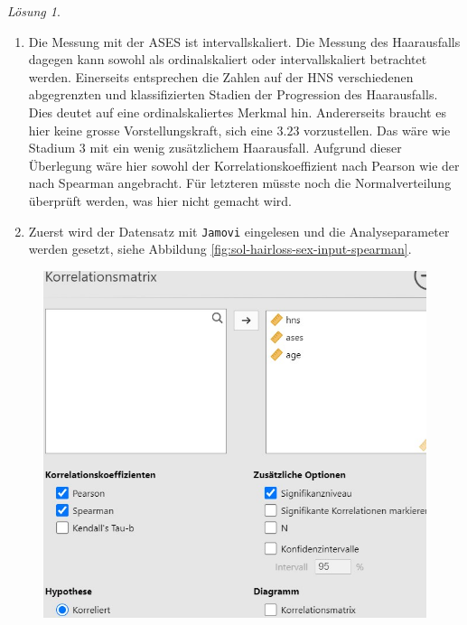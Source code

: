 \documentclass[
]{book}
\providecommand{\tightlist}{%
  \setlength{\itemsep}{0pt}\setlength{\parskip}{0pt}}
\theoremstyle{definition}
\theoremstyle{definition}
\theoremstyle{definition}
\theoremstyle{definition}
\theoremstyle{remark}
\newtheorem*{solution}{Lösung}
\begin{document}
\begin{solution}
\leavevmode

\begin{enumerate}
\def\labelenumi{\alph{enumi})}
\tightlist
\item
  Die Messung mit der ASES ist intervallskaliert. Die Messung des Haarausfalls dagegen kann sowohl als ordinalskaliert oder intervallskaliert betrachtet werden. Einerseits entsprechen die Zahlen auf der HNS verschiedenen abgegrenzten und klassifizierten Stadien der Progression des Haarausfalls. Dies deutet auf eine ordinalskaliertes Merkmal hin. Andererseits braucht es hier keine grosse Vorstellungskraft, sich eine \(3.23\) vorzustellen. Das wäre wie Stadium \(3\) mit ein wenig zusätzlichem Haarausfall. Aufgrund dieser Überlegung wäre hier sowohl der Korrelationskoeffizient nach Pearson wie der nach Spearman angebracht. Für letzteren müsste noch die Normalverteilung überprüft werden, was hier nicht gemacht wird.
\item
  Zuerst wird der Datensatz mit \texttt{Jamovi} eingelesen und die Analyseparameter werden gesetzt, siehe Abbildung \ref{fig:sol-hairloss-sex-input-spearman}.
\end{enumerate}

\begin{figure}

{\centering \includegraphics[width=1\linewidth]{figures/08-exr-hairloss-sex-jmv-input-spearman} 

}
\end{figure}
\end{solution}
\end{document}
